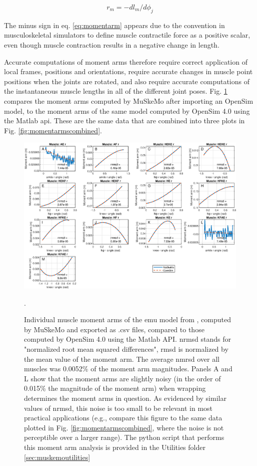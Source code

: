 \documentclass{article}
\begin{document}
\begin{equation}
r_m = -dl_m / d\phi_j
\end{equation}
\label{eq:momentarm}

The minus sign in eq. \ref{eq:momentarm} appears due to the convention in musculoskeletal simulators to define muscle contractile force as a positive scalar, even though muscle contraction results in a negative change in length.

Accurate computations of moment arms therefore require correct application of local frames, positions and orientations, require accurate changes in muscle point positions when the joints are rotated, and also require accurate computations of the instantaneous muscle lengths in all of the different joint poses. Fig. \ref{fig:momentarmsindividual} compares the moment arms computed by MuSkeMo after importing an OpenSim model, to the moment arms of the same model computed by OpenSim 4.0 using the Matlab api. These are the same data that are combined into three plots in Fig. \ref{fig:momentarmscombined}.

\begin{figure}[htbp]
    \centering
    \includegraphics[width=1\textwidth]{figures/emu_momentarms_individual_v2.eps} %
    \caption{Individual muscle moment arms of the emu model from \cite{vanbijlertMusclecontrolledPhysicsSimulations2024a}, computed by MuSkeMo and exported as .csv files, compared to those computed by OpenSim 4.0 using the Matlab API. nrmsd stands for "normalized root mean squared differences", rmsd is normalized by the mean value of the moment arm. The average nmrsd over all muscles was 0.0052\% of the moment arm magnitudes.
    Panels A and L show that the moment arms are slightly noisy (in the order of 0.015\% the magnitude of the moment arm) when wrapping determines the moment arms in question. As evidenced by similar values of nrmsd, this noise is too small to be relevant in most practical applications (e.g., compare this figure to the same data plotted in Fig. \ref{fig:momentarmscombined}, where the noise is not perceptible over a larger range).   
    The python script that performs this moment arm analysis is provided in the Utilities folder \ref{sec:muskemoutilities}}.
    \label{fig:momentarmsindividual}
\end{figure}
\end{document}
